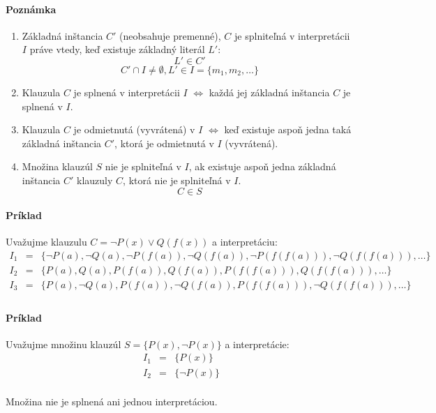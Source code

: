 \paragraph{Poznámka}
\begin{enumerate}
	\item Základná inštancia $C'$ (neobsahuje premenné), $C$ je splniteľná v interpretácii $I$
	práve vtedy, keď existuje základný literál $L'$:
	$$ L' \in C'$$
	$$ C' \cap I \neq \emptyset, L' \in I = \{m_1, m_2, \ldots \} $$

	\item Klauzula $C$ je splnená v interpretácii $I$ $\iff$ každá jej
	základná inštancia $C$ je splnená v $I$.

	\item Klauzula $C$ je odmietnutá (vyvrátená) v $I$ $\iff$ keď existuje
	aspoň jedna taká základná inštancia $C'$, ktorá je odmietnutá v $I$
	(vyvrátená).

	\item Množina klauzúl $S$ nie je splniteľná v $I$, ak existuje aspoň
	jedna základná inštancia $C'$ klauzuly $C$, ktorá nie je splniteľná v
	$I$. $$C \in S$$
\end{enumerate}


\paragraph{Príklad} Uvažujme klauzulu $C=\neg P(x) \lor Q(f(x))$ a
interpretáciu:
$$
\begin{array}{lll}
I_1 &=& \{ \neg P(a), \neg Q(a), \neg P(f(a)), \neg Q(f(a)), \neg P(f(f(a))),
\neg Q(f(f(a))), \ldots \} \\
I_2 &=& \{ P(a), Q(a), P(f(a)), Q(f(a)), P(f(f(a))), Q(f(f(a))), \ldots \} \\
I_3 &=& \{ P(a), \neg Q(a), P(f(a)), \neg Q(f(a)), P(f(f(a))), \neg Q(f(f(a))),
\ldots \} \\
\end{array}
$$

\paragraph{Príklad} Uvažujme množinu klauzúl $S=\{P(x), \neg P(x)\}$ a
interpretácie:
$$
\begin{array}{lll}
I_1 &=& \{ P(x) \} \\
I_2 &=& \{ \neg P(x) \} \\
\end{array}
$$

Množina nie je splnená ani jednou interpretáciou.

